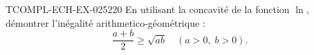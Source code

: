 \begin{exercice}{TCOMPL-ECH-EX-025}{2}{20}
En utilisant la concavité de la fonction $\ln$, démontrer l'inégalité arithmetico-géométrique :
\[ \frac{a+b}{2} \geq \sqrt{ab} \quad (a > 0,\; b > 0). \]

\end{exercice}
